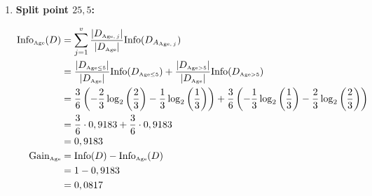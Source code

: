 \documentclass[
english,
smallborders
]{i6prcsht}
\newcommand{\OfSpecificValue}[3]{_{\text{\tiny #1#2#3}}}
\newcommand{\OfAttribute}[1]{_{\text{\tiny #1}}}
\begin{document}
\begin{solution}
\begin{enumerate}
\begin{enumerate}
\begin{enumerate}
\begin{enumerate}
			            \item \textbf{Split point $25,5$:}

			                  \begin{alignat*}{2}
				                  \text{Info}\OfAttribute{Age}(D) & = \sum_{j=1}^v \frac{|D\OfAttribute{Age$,j$}|}{|D\OfAttribute{Age}|} \text{Info}(D_{A\OfAttribute{Age$,j$}})                                                                                                                            \\
				                                                  & = \frac{|D\OfSpecificValue{Age}{$\leq$}{5}|}{|D\OfAttribute{Age}|} \text{Info}(D\OfSpecificValue{Age}{$\leq$}{5}) + \frac{|D\OfSpecificValue{Age}{$>$}{5}|}{|D\OfAttribute{Age}|} \text{Info}(D\OfSpecificValue{Age}{$>$}{5})           \\
				                                                  & = \frac{3}{6} \left(-\frac{2}{3} \log_2\left(\frac{2}{3}\right) - \frac{1}{3} \log_2\left(\frac{1}{3}\right)\right) + \frac{3}{6} \left(-\frac{1}{3} \log_2\left(\frac{1}{3}\right) - \frac{2}{3} \log_2\left(\frac{2}{3}\right)\right) \\
				                                                  & = \frac{3}{6} \cdot 0,9183 + \frac{3}{6} \cdot 0,9183                                                                                                                                                                                   \\
				                                                  & = 0,9183                                                                                                                                                                                                                                \\
				                  \text{Gain}\OfAttribute{Age}    & = \text{Info}(D) - \text{Info}\OfAttribute{Age}(D)                                                                                                                                                                                      \\
				                                                  & = 1 - 0,9183                                                                                                                                                                                                                            \\
				                                                  & = 0,0817                                                                                                                                                                                                                                \\
			                  \end{alignat*}


\end{enumerate}
\end{enumerate}
\end{enumerate}
\end{enumerate}
\end{solution}
\end{document}
